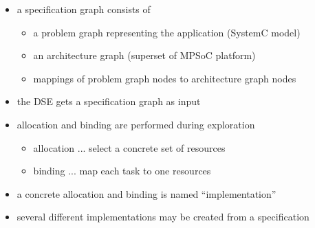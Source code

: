 \begin{frame}[t]
\begin{figure}
\vspace{-5mm}
\centering
\resizebox{0.5\columnwidth}{!}{}
\end{figure}
\begin{itemize}
\item a specification graph consists of 
\begin{itemize}
\item a problem graph representing the application (SystemC model)
\item an architecture graph (superset of MPSoC platform)
\item mappings of problem graph nodes to architecture graph nodes
\end{itemize}
\end{itemize}
\end{frame}


\begin{frame}[t]
\begin{itemize}
\item the DSE gets a specification graph as input
\item allocation and binding are performed during exploration 
\begin{itemize}
\item allocation ... select a concrete set of resources
\item binding ... map each task to one resources
\end{itemize}
\item a concrete allocation and binding is named ``implementation''
\item several different implementations may be created from a specification
\end{itemize}
\end{frame}


